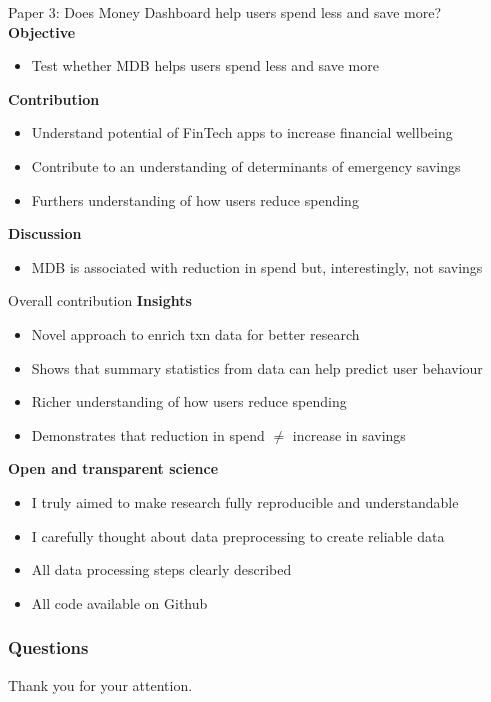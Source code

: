 \documentclass[xcolor=svgnames]{beamer}
\begin{document}
\begin{frame}{Paper 3: Does Money Dashboard help users spend less and save more?}
    \textbf{Objective}
    \begin{itemize}
        \item Test whether MDB helps users spend less and save more
    \end{itemize}
    \textbf{Contribution}
    \begin{itemize}
        \item Understand potential of FinTech apps to increase financial wellbeing
        \item Contribute to an understanding of determinants of emergency savings
        \item Furthers understanding of how users reduce spending
    \end{itemize}
    \textbf{Discussion}
    \begin{itemize}
        \item MDB is associated with reduction in spend but, interestingly, not savings
    \end{itemize}
\end{frame}

\begin{frame}{Overall contribution}
    \textbf{Insights}
    \begin{itemize}
        \item Novel approach to enrich txn data for better research
        \item Shows that summary statistics from data can help predict user behaviour
        \item Richer understanding of how users reduce spending
        \item Demonstrates that reduction in spend $\neq$ increase in savings
    \end{itemize}
    \textbf{Open and transparent science}
    \begin{itemize}        
        \item I truly aimed to make research fully reproducible and understandable
        \item I carefully thought about data preprocessing to create reliable data
        \item All data processing steps clearly described
        \item All code available on Github
    \end{itemize}
\end{frame}




\begin{frame}\frametitle{Questions}
    Thank you for your attention.
\end{frame}
\end{document}
